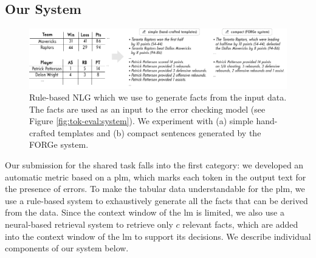 


\subsection{Our System}
\label{sec:tok-eval:system}

\begin{figure}[ht]
    \centering
    \includegraphics[width=\textwidth]{img/tok-eval_generator.pdf}
    \caption{Rule-based NLG which we use to generate facts from the input data. The facts are used as an input to the error checking model (see Figure \ref{fig:tok-eval:system}). We experiment with (a) simple hand-crafted templates and (b) compact sentences generated by the FORGe system.}
    \label{fig:tok-eval:gen}
\end{figure}





Our submission for the shared task falls into the first category: we developed an automatic metric based on a \ac{plm}, which marks each token in the output text for the presence of errors. To make the tabular data understandable for the \ac{plm}, we use a rule-based system to exhaustively generate all the facts that can be derived from the data. Since the context window of the \ac{lm} is limited, we also use a neural-based retrieval system to retrieve only $c$ relevant facts, which are added into the context window of the \ac{lm} to support its decisions. We describe individual components of our system below.


